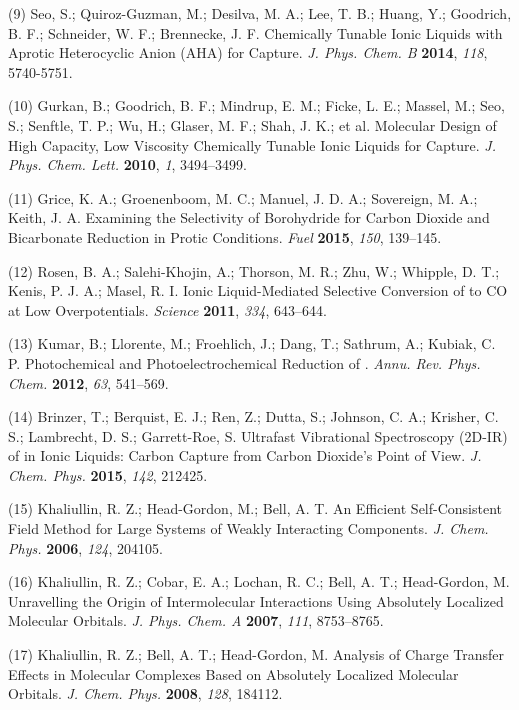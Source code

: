 (9) Seo, S.; Quiroz-Guzman, M.; Desilva, M. A.; Lee, T. B.; Huang, Y.; Goodrich, B. F.; Schneider, W. F.; Brennecke, J. F. Chemically Tunable Ionic Liquids with Aprotic Heterocyclic Anion (AHA) for  Capture. \emph{J. Phys. Chem. B} \textbf{2014}, \emph{118}, 5740-5751.

(10) Gurkan, B.; Goodrich, B. F.; Mindrup, E. M.; Ficke, L. E.; Massel, M.; Seo, S.; Senftle, T. P.; Wu, H.; Glaser, M. F.; Shah, J. K.; et al.  Molecular Design of High Capacity, Low Viscosity Chemically Tunable Ionic Liquids for  Capture. \emph{J. Phys. Chem.  Lett.} \textbf{2010}, \emph{1}, 3494--3499.

(11) Grice, K. A.; Groenenboom, M. C.; Manuel, J. D. A.; Sovereign, M.  A.; Keith, J. A. Examining the Selectivity of Borohydride for Carbon Dioxide and Bicarbonate Reduction in Protic Conditions. \emph{Fuel} \textbf{2015}, \emph{150}, 139--145.

(12) Rosen, B. A.; Salehi-Khojin, A.; Thorson, M. R.; Zhu, W.; Whipple, D. T.; Kenis, P. J. A.; Masel, R. I. Ionic Liquid-Mediated Selective Conversion of  to CO at Low Overpotentials.  \emph{Science} \textbf{2011}, \emph{334}, 643--644.

(13) Kumar, B.; Llorente, M.; Froehlich, J.; Dang, T.; Sathrum, A.; Kubiak, C. P. Photochemical and Photoelectrochemical Reduction of . \emph{Annu. Rev. Phys. Chem.} \textbf{2012}, \emph{63}, 541--569.

(14) Brinzer, T.; Berquist, E. J.; Ren, Z.; Dutta, S.; Johnson, C. A.; Krisher, C. S.; Lambrecht, D. S.; Garrett-Roe, S. Ultrafast Vibrational Spectroscopy (2D-IR) of  in Ionic Liquids: Carbon Capture from Carbon Dioxide's Point of View. \emph{J. Chem. Phys.}  \textbf{2015}, \emph{142}, 212425.

(15) Khaliullin, R. Z.; Head-Gordon, M.; Bell, A. T. An Efficient Self-Consistent Field Method for Large Systems of Weakly Interacting Components. \emph{J. Chem. Phys.} \textbf{2006}, \emph{124}, 204105.

(16) Khaliullin, R. Z.; Cobar, E. A.; Lochan, R. C.; Bell, A. T.; Head-Gordon, M. Unravelling the Origin of Intermolecular Interactions Using Absolutely Localized Molecular Orbitals. \emph{J. Phys. Chem. A} \textbf{2007}, \emph{111}, 8753--8765.

(17) Khaliullin, R. Z.; Bell, A. T.; Head-Gordon, M. Analysis of Charge Transfer Effects in Molecular Complexes Based on Absolutely Localized Molecular Orbitals. \emph{J. Chem. Phys.} \textbf{2008}, \emph{128}, 184112.

